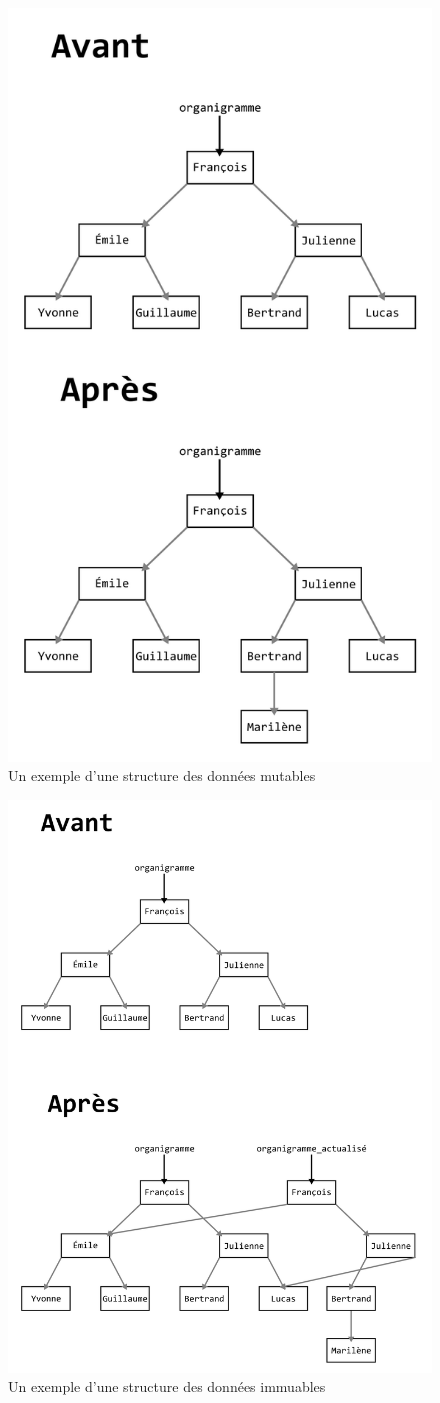 \documentclass[french]{report}
\begin{document}
\begin{figure}[h]
	\centering
	\includegraphics[width=0.7\linewidth]{mutable_tree}
	\caption{Un exemple d'une structure des données mutables}
	\label{fig:mutable-tree}
\end{figure}

\begin{figure}[h]
	\centering
	\includegraphics[width=0.7\linewidth]{immutable_tree}
	\caption{Un exemple d'une structure des données immuables}
	\label{fig:immutable-tree}
\end{figure}
\end{document}
